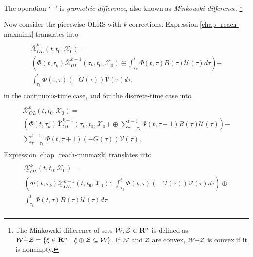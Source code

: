 \documentclass[letterpaper,10pt,english]{sphinxmanual}
\begin{document}
The operation ‘\(\dot{-}\)’ is \emph{geometric difference}, also known as
\emph{Minkowski difference}. \footnote{
The Minkowski difference of sets
\({\mathcal W}, {\mathcal Z}\in{\bf R}^n\) is defined as
\({\mathcal W}\dot{-}{\mathcal Z}= \left\{\xi\in{\bf R}^n ~|~
\xi \oplus {\mathcal Z}\subseteq {\mathcal W}\right\}\). If
\({\mathcal W}\) and \({\mathcal Z}\) are convex,
\({\mathcal W}\dot{-}{\mathcal Z}\) is convex if it is nonempty.
}

Now consider the piecewise OLRS with \(k\) corrections. Expression
\eqref{chap_reach-maxmink} translates into
\label{chap_reach:equation-ctlsmaxmink}\begin{gather}
\begin{split}\begin{array}{l}
\overline{{\mathcal X}}_{OL}^k(t, t_0, {\mathcal X}_0) = \\
\left(\Phi(t, \tau_k)\overline{{\mathcal X}}_{OL}^{k-1}(\tau_k, t_0, {\mathcal X}_0) \oplus
\int_{\tau_k}^t\Phi(t, \tau)B(\tau){\mathcal U}(\tau)d\tau\right) \dot{-} \\
\int_{\tau_k}^t\Phi(t, \tau)(-G(\tau)){\mathcal V}(\tau)d\tau,
\end{array}\end{split}\label{chap_reach-ctlsmaxmink}
\end{gather}
in the continuous-time case, and for the discrete-time case into
\label{chap_reach:equation-dtlsmaxmink}\begin{gather}
\begin{split}\begin{array}{l}
\overline{{\mathcal X}}_{OL}^k(t, t_0, {\mathcal X}_0) = \\
\left(\Phi(t, \tau_k)\overline{{\mathcal X}}_{OL}^{k-1}(\tau_k, t_0, {\mathcal X}_0) \oplus
\sum_{\tau=\tau_k}^{t-1}\Phi(t, \tau+1)B(\tau){\mathcal U}(\tau)\right) \dot{-} \\
\sum_{\tau=\tau_k}^{t-1}\Phi(t, \tau+1)(-G(\tau)){\mathcal V}(\tau).
\end{array}\end{split}\label{chap_reach-dtlsmaxmink}
\end{gather}
Expression \eqref{chap_reach-minmaxk} translates into
\label{chap_reach:equation-ctlsminmaxk}\begin{gather}
\begin{split}\begin{array}{l}
\underline{{\mathcal X}}_{OL}^k(t, t_0, {\mathcal X}_0) = \\
\left(\Phi(t, \tau_k)\underline{{\mathcal X}}_{OL}^{k-1}(t, t_0, {\mathcal X}_0) \dot{-}
\int_{\tau_k}^t\Phi(t, \tau)(-G(\tau)){\mathcal V}(\tau)d\tau\right)
\oplus \\
\int_{\tau_k}^t\Phi(t, \tau)B(\tau){\mathcal U}(\tau)d\tau,
\end{array}\end{split}\label{chap_reach-ctlsminmaxk}
\end{gather}
\end{document}

